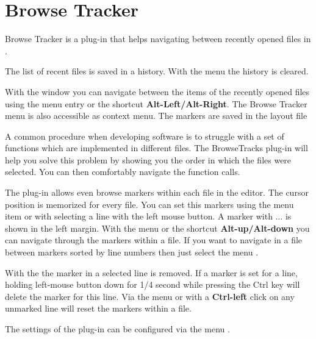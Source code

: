 \section{Browse Tracker}\label{sec:browsetracker}

Browse Tracker is a plug-in that helps navigating between recently opened files in \codeblocks.

The list of recent files is saved in a history.
With the menu  the history is cleared.

With the window  you can navigate between the items of the recently opened files using the menu entry  or the shortcut \textbf{Alt-Left/Alt-Right}. The Browse Tracker menu is also accessible as context menu. The markers are saved in the layout file 

A common procedure when developing software is to struggle with a set of functions which are implemented in different files. The BrowseTracks plug-in will help you solve this problem by showing you the order in which the files were selected. You can then comfortably navigate the function calls.

The plug-in allows even browse markers within each file in the \codeblocks editor. The cursor position is memorized for every file. You can set this markers using the menu item  or with selecting a line with the left mouse button. A marker with $\ldots$ is shown in the left margin. With the menu  or the shortcut \textbf{Alt-up/Alt-down} you can navigate through the markers within a file. If you want to navigate in a file between markers sorted by line numbers then just select the menu .

With the  the marker in a selected line is removed. If a marker is set for a line, holding left-mouse button down for 1/4 second while pressing the Ctrl key will delete the marker for this line. Via the menu  or with a \textbf{Ctrl-left} click on any unmarked line will reset the markers within a file.

The settings of the plug-in can be configured via the menu .

